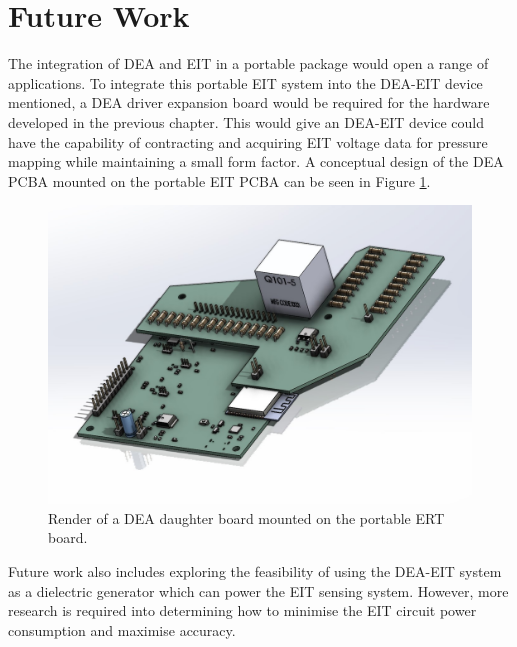 \section{Future Work}
The integration of DEA and EIT in a portable package would open a range of applications. To integrate this portable EIT system into the DEA-EIT device mentioned, a DEA driver expansion board would be required for the hardware developed in the previous chapter. This would give an DEA-EIT device could have the capability of contracting and acquiring EIT voltage data for pressure mapping while maintaining a small form factor. A conceptual design of the DEA PCBA mounted on the portable EIT PCBA can be seen in Figure \ref{fig:DEA-EIT_draft_pcb_assy}. 
\begin{figure}[H]
	\centering
	\includegraphics[width=0.55\linewidth]{Figures/DEA-EIT_mother-daughter_board_draft.jpg}
	\caption{Render of a DEA daughter board mounted on the portable ERT board.}
	\label{fig:DEA-EIT_draft_pcb_assy}
\end{figure}
Future work also includes exploring the feasibility of using the DEA-EIT system as a dielectric generator which can power the EIT sensing system. However, more research is required into determining how to minimise the EIT circuit power consumption and maximise accuracy.

\afterpage{\blankpage}